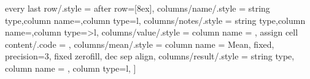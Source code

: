   every last row/.style = {after row=[8ex]\AfterLastRow},%
  columns/name/.style = {string type,column name=,column type=l},%
  columns/notes/.style = {string type,column name=\NameNotes{},column type={>{\hskip-27pt}l}},%
  columns/value/.style = {%
    column name = {\xtoplabel},%
    assign cell content/.code = {%
      \ifnum{}%
      {\multirow{\numberofrows}{\plotwidth}{\errplot}}%
      \else%
      \fi%
    }%
  },%
  columns/mean/.style   = {column name = Mean, fixed, precision=3, fixed zerofill, dec sep align},%
  columns/result/.style = {string type, column name = , column type=l},%
]{\data}%
\endgroup%
